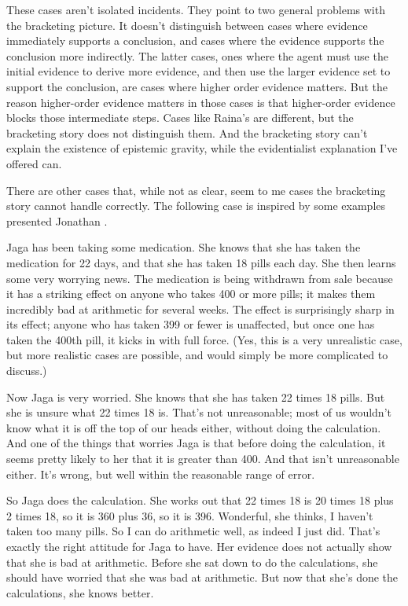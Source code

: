 These cases aren't isolated incidents. They point to two general problems with the bracketing picture. It doesn't distinguish between cases where evidence immediately supports a conclusion, and cases where the evidence supports the conclusion more indirectly. The latter cases, ones where the agent must use the initial evidence to derive more evidence, and then use the larger evidence set to support the conclusion, are cases where higher order evidence matters. But the reason higher-order evidence matters in those cases is that higher-order evidence blocks those intermediate steps. Cases like Raina's are different, but the bracketing story does not distinguish them. And the bracketing story can't explain the existence of epistemic gravity, while the evidentialist explanation I've offered can.

There are other cases that, while not as clear, seem to me cases the bracketing story cannot handle correctly. The following case is inspired by some examples presented Jonathan \citet{Weisberg2010}.

\gls{Jaga} has been taking some medication. She knows that she has taken the medication for 22 days, and that she has taken 18 pills each day. She then learns some very worrying news. The medication is being withdrawn from sale because it has a striking effect on anyone who takes 400 or more pills; it makes them incredibly bad at arithmetic for several weeks. The effect is surprisingly sharp in its effect; anyone who has taken 399 or fewer is unaffected, but once one has taken the 400th pill, it kicks in with full force. (Yes, this is a very unrealistic case, but more realistic cases are possible, and would simply be more complicated to discuss.)

Now \gls{Jaga} is very worried. She knows that she has taken 22 times 18 pills. But she is unsure what 22 times 18 is. That's not unreasonable; most of us wouldn't know what it is off the top of our heads either, without doing the calculation. And one of the things that worries \gls{Jaga} is that before doing the calculation, it seems pretty likely to her that it is greater than 400. And that isn't unreasonable either. It's wrong, but well within the reasonable range of error.

So \gls{Jaga} does the calculation. She works out that 22 times 18 is 20 times 18 plus 2 times 18, so it is 360 plus 36, so it is 396. Wonderful, she thinks, I haven't taken too many pills. So I can do arithmetic well, as indeed I just did. That's exactly the right attitude for \gls{Jaga} to have. Her evidence does not actually show that she is bad at arithmetic. Before she sat down to do the calculations, she should have worried that she was bad at arithmetic. But now that she's done the calculations, she knows better.

